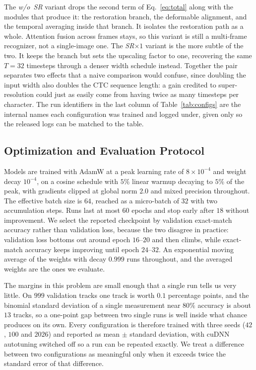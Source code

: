 \documentclass[runningheads]{llncs}
\begin{document}
The \emph{w/o~SR} variant drops the second term of Eq.~\eqref{eq:total} along with the modules that produce it: the restoration branch, the deformable alignment, and the temporal averaging inside that branch. It isolates the restoration path as a whole. Attention fusion across frames stays, so this variant is still a multi-frame recognizer, not a single-image one. The \emph{SR$\times 1$} variant is the more subtle of the two. It keeps the branch but sets the upscaling factor to one, recovering the same $T = 32$ timesteps through a denser width schedule instead. Together the pair separates two effects that a naive comparison would confuse, since doubling the input width also doubles the CTC sequence length: a gain credited to super-resolution could just as easily come from having twice as many timesteps per character. The run identifiers in the last column of Table~\ref{tab:configs} are the internal names each configuration was trained and logged under, given only so the released logs can be matched to the table.


\subsection{Optimization and Evaluation Protocol}
\label{sec:protocol}

Models are trained with AdamW at a peak learning rate of $8\times10^{-4}$ and weight decay $10^{-4}$, on a cosine schedule with $5\%$ linear warmup decaying to $5\%$ of the peak, with gradients clipped at global norm $2.0$ and mixed precision throughout. The effective batch size is $64$, reached as a micro-batch of $32$ with two accumulation steps. Runs last at most $60$ epochs and stop early after $18$ without improvement. We select the reported checkpoint by validation exact-match accuracy rather than validation loss, because the two disagree in practice: validation loss bottoms out around epoch $16$--$20$ and then climbs, while exact-match accuracy keeps improving until epoch $24$--$32$. An exponential moving average of the weights with decay $0.999$ \cite{tarvainen2017mean} runs throughout, and the averaged weights are the ones we evaluate.

The margins in this problem are small enough that a single run tells us very little. On $999$ validation tracks one track is worth $0.1$ percentage points, and the binomial standard deviation of a single measurement near $80\%$ accuracy is about $13$ tracks, so a one-point gap between two single runs is well inside what chance produces on its own. Every configuration is therefore trained with three seeds ($42$, $100$ and $2026$) and reported as mean $\pm$ standard deviation, with cuDNN autotuning switched off so a run can be repeated exactly. We treat a difference between two configurations as meaningful only when it exceeds twice the standard error of that difference.
\end{document}
